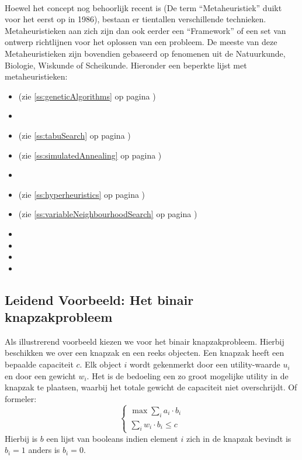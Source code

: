 \paragraph{}Hoewel het concept nog behoorlijk recent is (De term ``Metaheuristiek'' duikt voor het eerst op in 1986), bestaan er tientallen verschillende technieken. Metaheuristieken aan zich zijn dan ook eerder een ``Framework'' of een set van ontwerp richtlijnen voor het oplossen van een probleem. De meeste van deze Metaheuristieken zijn bovendien gebaseerd op fenomenen uit de Natuurkunde, Biologie, Wiskunde of Scheikunde. Hieronder een beperkte lijst met metaheuristieken:
\begin{multicols}{2}
\begin{itemize}
 \item {} (zie \ref{ss:geneticAlgorithms} op pagina \pageref{ss:geneticAlgorithms})
 \item {}
 \item {} (zie \ref{ss:tabuSearch} op pagina \pageref{ss:tabuSearch})
 \item {} (zie \ref{ss:simulatedAnnealing} op pagina \pageref{ss:simulatedAnnealing})
 \item {}
 \item {} (zie \ref{ss:hyperheuristics} op pagina \pageref{ss:hyperheuristics})
 \item {} (zie \ref{ss:variableNeighbourhoodSearch} op pagina \pageref{ss:variableNeighbourhoodSearch})
 \item {}
 \item {}
 \item {}
 \item {}
\end{itemize}
\end{multicols}
\subsection{Leidend Voorbeeld: Het binair knapzakprobleem}
\begin{leftbar}
Als illustrerend voorbeeld kiezen we voor het binair knapzakprobleem. Hierbij beschikken we over een knapzak en een reeks objecten. Een knapzak heeft een bepaalde capaciteit $c$. Elk object $i$ wordt gekenmerkt door een utility-waarde $u_i$ en door een gewicht $w_i$. Het is de bedoeling een zo groot mogelijke utility in de knapzak te plaatsen, waarbij het totale gewicht de capaciteit niet overschrijdt. Of formeler:
\begin{equation}
\left\{\begin{array}{l}
\max\displaystyle\sum_i{a_i\cdot b_i}\\
\displaystyle\sum_i{w_i\cdot b_i}\leq c
\end{array}\right.
\end{equation}
Hierbij is $b$ een lijst van booleans indien element $i$ zich in de knapzak bevindt is $b_i=1$ anders is $b_i=0$.
\end{leftbar}
